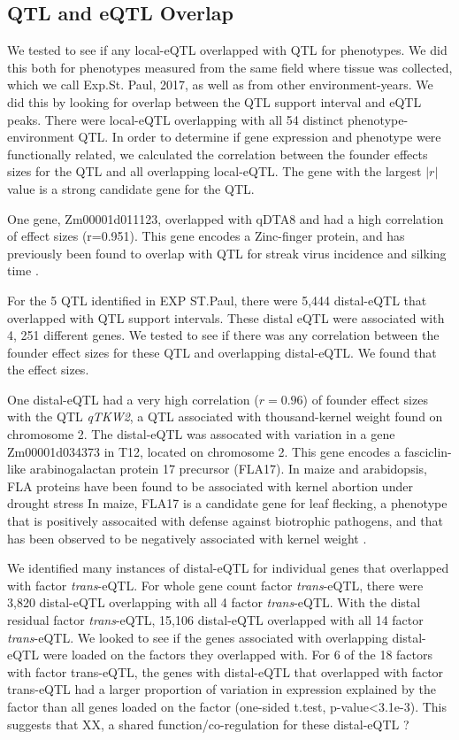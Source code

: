 \documentclass[article,9pt,twocolumn,twoside]{rilabRxiv}
\begin{document}
\subsection{QTL and eQTL Overlap}
We tested to see if any local-eQTL overlapped with QTL for phenotypes.
We did this both for phenotypes measured from the same field where tissue was collected, which we call Exp.St. Paul, 2017, as well as from other environment-years.
We did this by looking for overlap between the QTL support interval and eQTL peaks.
There were local-eQTL overlapping with all 54 distinct phenotype-environment QTL.
In order to determine if gene expression and phenotype were functionally related, we calculated the correlation between the founder effects sizes for the QTL and all overlapping local-eQTL.
The gene with the largest $|r|$ value is a strong candidate gene for the QTL.

One gene, Zm00001d011123, overlapped with qDTA8 and had a high correlation of effect sizes (r=0.951).
This gene encodes a Zinc-finger protein, and has previously been found to overlap with QTL for streak virus incidence and silking time \citep{Nair,JimenezGalindo}.

For the 5 QTL identified in EXP ST.Paul, there were 5,444 distal-eQTL that overlapped with QTL support intervals.
These distal eQTL were associated with 4, 251 different genes.
We tested to see if there was any correlation between the founder effect sizes for these QTL and overlapping distal-eQTL.
We found that the effect sizes.

One distal-eQTL had a very high correlation ($r=0.96$) of founder effect sizes with the QTL \emph{qTKW2}, a QTL associated with thousand-kernel weight found on chromosome 2.
The distal-eQTL was assocated with variation in a gene Zm00001d034373 in T12, located on chromosome 2.
This gene encodes a fasciclin-like arabinogalactan protein 17 precursor (FLA17).
In maize and arabidopsis, FLA proteins have been found to be associated with kernel abortion under drought stress \citep{Cagnola}
In maize, FLA17 is a candidate gene for leaf flecking, a phenotype that is positively assocaited with defense against biotrophic pathogens, and that has been observed to be negatively associated with kernel weight \citep{Olukolu}.


We identified many instances of distal-eQTL for individual genes that overlapped with factor \textit{trans}-eQTL.
For whole gene count factor \textit{trans}-eQTL, there were 3,820 distal-eQTL overlapping with all 4 factor \textit{trans}-eQTL.
With the distal residual factor \textit{trans}-eQTL, 15,106 distal-eQTL overlapped with all 14 factor \textit{trans}-eQTL.
We looked to see if the genes associated with overlapping distal-eQTL were loaded on the factors they overlapped with.
For 6 of the 18 factors with factor trans-eQTL, the genes with distal-eQTL that overlapped with factor trans-eQTL had a larger proportion of variation in expression explained by the factor than all genes loaded on the factor (one-sided t.test, p-value<3.1e-3).
This suggests that XX, a shared function/co-regulation for these distal-eQTL ?
\end{document}
